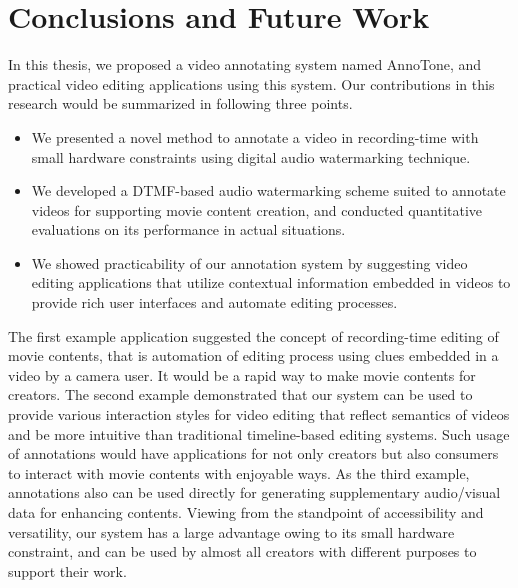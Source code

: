 \chapter{Conclusions and Future Work}

In this thesis, we proposed a video annotating system named AnnoTone, and practical video editing applications using this system.
Our contributions in this research would be summarized in following three points.
\begin{itemize}
\item We presented a novel method to annotate a video in recording-time with small hardware constraints using digital audio watermarking technique.
\item We developed a DTMF-based audio watermarking scheme suited to annotate videos for supporting movie content creation, and conducted quantitative evaluations on its performance in actual situations.
\item We showed practicability of our annotation system by suggesting video editing applications that utilize contextual information embedded in videos to provide rich user interfaces and automate editing processes.
\end{itemize}
The first example application suggested the concept of recording-time editing of movie contents, that is automation of editing process using clues embedded in a video by a camera user.
It would be a rapid way to make movie contents for creators.
The second example demonstrated that our system can be used to provide various interaction styles for video editing that reflect semantics of videos and be more intuitive than traditional timeline-based editing systems.
Such usage of annotations would have applications for not only creators but also consumers to interact with movie contents with enjoyable ways.
As the third example, annotations also can be used directly for generating supplementary audio/visual data for enhancing contents.
Viewing from the standpoint of accessibility and versatility, our system has a large advantage owing to its small hardware constraint, and can be used by almost all creators with different purposes to support their work.

